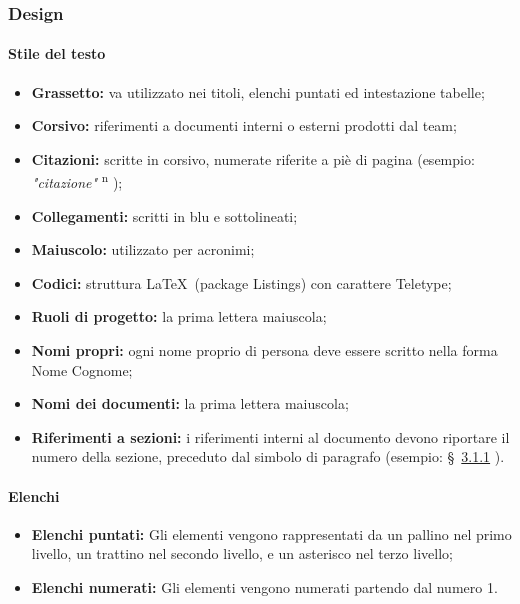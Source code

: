 \documentclass[11pt,a4paper]{article}
\begin{document}
	\subsubsection{Design}
	
	\paragraph{Stile del testo}
	
	\noindent   
	\begin{itemize}
		\item \textbf{Grassetto:} va utilizzato nei titoli, elenchi puntati ed intestazione tabelle;
		\item \textbf{Corsivo:} riferimenti a documenti interni o esterni prodotti dal team;
		\item \textbf{Citazioni:} scritte in corsivo, numerate riferite a piè di pagina (esempio: \textit{"citazione"} \textsuperscript{n} );
		\item \textbf{Collegamenti:} scritti in blu e sottolineati;
		\item \textbf{Maiuscolo:} utilizzato per acronimi;
		\item \textbf{Codici:} struttura \LaTeX\ (package Listings) con carattere Teletype;
		\item \textbf{Ruoli di progetto:} la prima lettera maiuscola;
		\item \textbf{Nomi propri:} ogni nome proprio di persona deve essere scritto nella forma Nome Cognome;
		\item \textbf{Nomi dei documenti:} la prima lettera maiuscola;
		\item \textbf{Riferimenti a sezioni:} i riferimenti interni al documento devono riportare il numero della sezione, preceduto dal simbolo di paragrafo (esempio: \S\ \hyperref[c]{3.1.1} ).
		
	\end{itemize}


	\paragraph{Elenchi}
	\begin{itemize}
	\item \textbf{Elenchi puntati:} Gli elementi vengono rappresentati da un pallino nel primo livello, un trattino nel secondo livello, e un asterisco nel terzo livello; 
	\item \textbf{Elenchi numerati:} Gli elementi vengono numerati partendo dal numero 1.
	\end{itemize}
\end{document}
